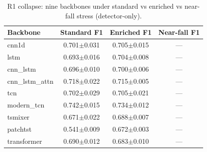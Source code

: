 \begin{table}[!t]
\centering
\caption{R1 collapse: nine backbones under standard vs enriched vs near-fall stress (detector-only).}
\label{tab:collapse}
\begin{tabular}{lccc}
\toprule
Backbone & Standard F1 & Enriched F1 & Near-fall F1 \\
\midrule
cnn1d & 0.701$\pm$0.031 & 0.705$\pm$0.015 & --- \\
lstm & 0.693$\pm$0.016 & 0.704$\pm$0.008 & --- \\
cnn\_lstm & 0.696$\pm$0.010 & 0.700$\pm$0.006 & --- \\
cnn\_lstm\_attn & 0.718$\pm$0.022 & 0.715$\pm$0.005 & --- \\
tcn & 0.702$\pm$0.029 & 0.705$\pm$0.021 & --- \\
modern\_tcn & 0.742$\pm$0.015 & 0.734$\pm$0.012 & --- \\
tsmixer & 0.671$\pm$0.022 & 0.688$\pm$0.007 & --- \\
patchtst & 0.541$\pm$0.009 & 0.672$\pm$0.003 & --- \\
transformer & 0.690$\pm$0.012 & 0.683$\pm$0.010 & --- \\
\bottomrule
\end{tabular}
\end{table}
